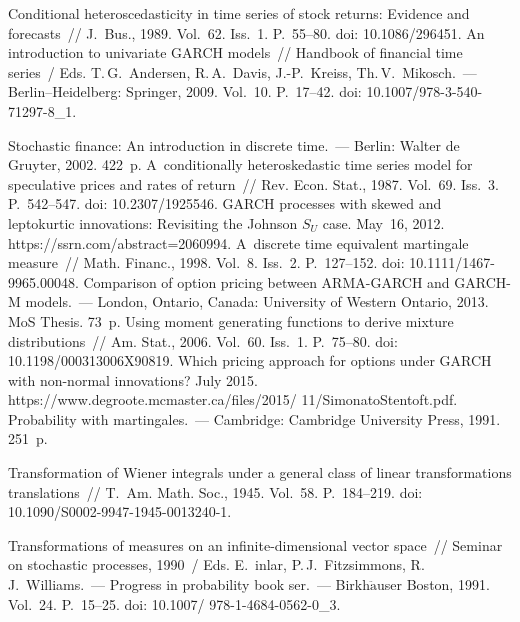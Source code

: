 \begin{multicols}{2}
{{\begin{thebibliography}{99}
 Conditional heteroscedasticity in time series of stock returns: Evidence and 
forecasts~// J.~Bus., 1989. Vol.~62. Iss.~1. P.~55--80. doi: 10.1086/296451.
An introduction to univariate GARCH models~// 
Handbook of financial time series~/ Eds. T.\,G.~Andersen, R.\,A.~Davis,  
J.-P.~Kreiss, Th.\,V.~Mikosch.~--- Berlin--Heidelberg: Springer, 2009. 
Vol.~10. P.~17--42. doi: 10.1007/978-3-540-71297-8\_1.

 Stochastic finance: An introduction in discrete time.~--- Berlin: Walter 
de Gruyter, 2002. 422~p.
 A~conditionally heteroskedastic time series model for speculative prices and 
rates of return~// Rev. Econ. Stat., 1987. Vol.~69. Iss.~3. P.~542--547. doi: 
10.2307/1925546.
 GARCH processes with skewed and leptokurtic innovations: Revisiting the 
Johnson $S_U$ case. May~16, 2012. {\sf https://ssrn.com/abstract=2060994}.
 A~discrete time equivalent martingale 
measure~// Math. Financ., 
1998. Vol.~8. Iss.~2. P.~127--152. doi: 10.1111/1467-9965.00048.
 Comparison of option pricing between ARMA-GARCH and GARCH-M 
models.~--- London, Ontario, Canada: University of Western Ontario, 2013. 
MoS Thesis. 73~p.
 Using moment generating functions to derive mixture distributions~// 
Am. Stat., 2006. Vol.~60. Iss.~1. P.~75--80. doi: 10.1198/000313006X90819.
 Which pricing approach for options under GARCH with  
non-normal innovations? July 2015. {\sf 
https://www.degroote.mcmaster.ca/files/2015/ 11/SimonatoStentoft.pdf}.
 Probability with martingales.~--- Cambridge: Cambridge University Press, 1991. 
251~p.

 Transformation of Wiener integrals under a general class of 
linear transformations translations~// T.~Am. Math. Soc., 1945. Vol.~58. P.~184--219. doi: 
10.1090/S0002-9947-1945-0013240-1.

Transformations of measures on an infinite-dimensional vector space~// 
Seminar on stochastic processes, 1990~/ 
Eds. 
\mbox{E.~{\!}inlar}, P.\,J.~Fitzsimmons, R.\,J.~Williams.~--- 
Progress in 
probability book ser.~--- Birkh$\ddot{\mbox{a}}$user Boston, 1991. Vol.~24.  P.~15--25. doi: 
10.1007/ 978-1-4684-0562-0\_3.

 \end{thebibliography}

 }
 }

\end{multicols}

